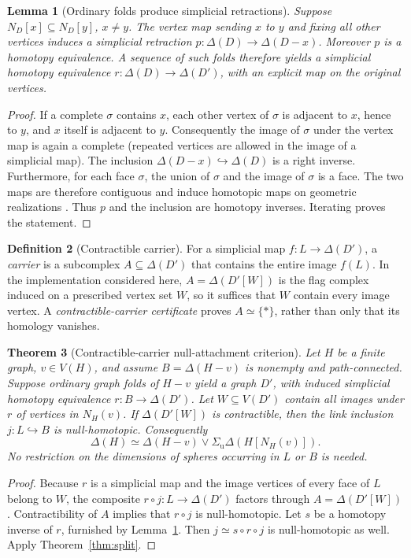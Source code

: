 \documentclass[11pt,letterpaper]{article}
\newtheorem{theorem}{Theorem}[section]
\newtheorem{lemma}[theorem]{Lemma}
\theoremstyle{definition}
\newtheorem{definition}[theorem]{Definition}
\theoremstyle{remark}
\newcommand{\Del}{\Delta}
\newcommand{\SigmaU}{\Sigma_{\mathrm u}}
\newcommand{\N}{N}
\begin{document}
\begin{lemma}[Ordinary folds produce simplicial retractions]\label{lem:fold}
Suppose \(\N_D[x]\subseteq\N_D[y]\), \(x\ne y\). The vertex map sending \(x\) to \(y\) and fixing all other vertices induces a simplicial retraction \(p:\Del(D)\to\Del(D-x)\). Moreover \(p\) is a homotopy equivalence. A sequence of such folds therefore yields a simplicial homotopy equivalence \(r:\Del(D)\to\Del(D')\), with an explicit map on the original vertices.
\end{lemma}
\begin{proof}
If a complete \(\sigma\) contains \(x\), each other vertex of \(\sigma\) is adjacent to \(x\), hence to \(y\), and \(x\) itself is adjacent to \(y\). Consequently the image of \(\sigma\) under the vertex map is again a complete (repeated vertices are allowed in the image of a simplicial map). The inclusion \(\Del(D-x)\hookrightarrow\Del(D)\) is a right inverse. Furthermore, for each face \(\sigma\), the union of \(\sigma\) and the image of \(\sigma\) is a face. The two maps are therefore contiguous and induce homotopic maps on geometric realizations \cite[Chs.~2--3]{Kozlov2008}. Thus \(p\) and the inclusion are homotopy inverses. Iterating proves the statement.
\end{proof}

\begin{definition}[Contractible carrier]
For a simplicial map \(f:L\to\Del(D')\), a \emph{carrier} is a subcomplex \(A\subseteq\Del(D')\) that contains the entire image \(f(L)\). In the implementation considered here, \(A=\Del(D'[W])\) is the flag complex induced on a prescribed vertex set \(W\), so it suffices that \(W\) contain every image vertex. A \emph{contractible-carrier certificate} proves \(A\simeq\{\ast\}\), rather than only that its homology vanishes.
\end{definition}

\begin{theorem}[Contractible-carrier null-attachment criterion]\label{thm:carrier}
Let \(H\) be a finite graph, \(v\in V(H)\), and assume \(B=\Del(H-v)\) is nonempty and path-connected. Suppose ordinary graph folds of \(H-v\) yield a graph \(D'\), with induced simplicial homotopy equivalence \(r:B\to\Del(D')\). Let \(W\subseteq V(D')\) contain all images under \(r\) of vertices in \(\N_H(v)\). If \(\Del(D'[W])\) is contractible, then the link inclusion \(j:L\hookrightarrow B\) is null-homotopic. Consequently
\[
 \boxed{\Del(H)\simeq\Del(H-v)\vee\SigmaU\Del(H[\N_H(v)]).}
\]
No restriction on the dimensions of spheres occurring in \(L\) or \(B\) is needed.
\end{theorem}
\begin{proof}
Because \(r\) is a simplicial map and the image vertices of every face of \(L\) belong to \(W\), the composite \(r\circ j:L\to\Del(D')\) factors through \(A=\Del(D'[W])\). Contractibility of \(A\) implies that \(r\circ j\) is null-homotopic. Let \(s\) be a homotopy inverse of \(r\), furnished by Lemma~\ref{lem:fold}. Then \(j\simeq s\circ r\circ j\) is null-homotopic as well. Apply Theorem~\ref{thm:split}. \end{proof}
\end{document}
